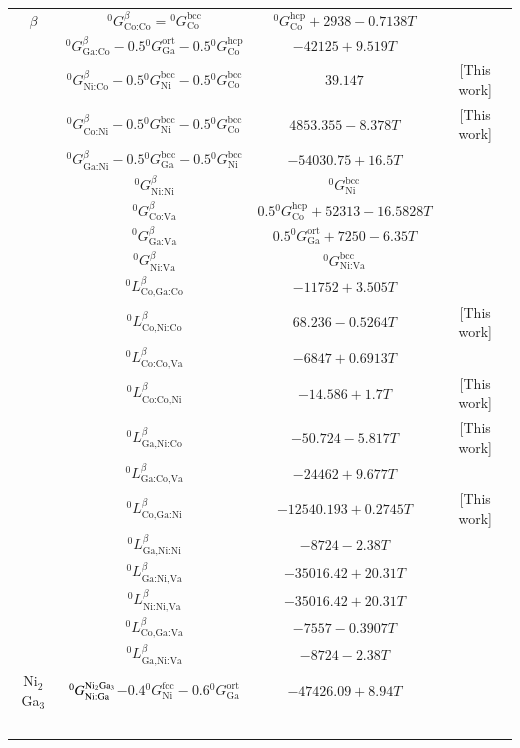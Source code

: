 \documentclass[article]{elsarticle}
\begin{document}
\begin{longtable}{| c | c | c |c|}
\hline
$\beta$ & $^{0}G_{\text{Co:Co}}^{\beta}={}^{\text{0}}G_{\text{Co}}^{\text{bcc}}$ & $^{\text{0}}G_{\text{Co}}^{\text{hcp}}+2938-0.7138T$ & \cite{05Su} \tabularnewline
 & $^{0}G_{\text{Ga:Co}}^{\beta}-0.5{}^{\text{0}}G_{\text{Ga}}^{\text{ort}}-0.5{}^{\text{0}}G_{\text{Co}}^{\text{hcp}}$ & $-42125+9.519T$ & \cite{Cha10} \tabularnewline
  & $^{0}G_{\text{Ni:Co}}^{\beta}-0.5{}^{\text{0}}G_{\text{Ni}}^{\text{bcc}}-0.5{}^{\text{0}}G_{\text{Co}}^{\text{bcc}}$ & $39.147$ & [This work] \tabularnewline
  & $^{0}G_{\text{Co:Ni}}^{\beta}-0.5{}^{\text{0}}G_{\text{Ni}}^{\text{bcc}}-0.5{}^{\text{0}}G_{\text{Co}}^{\text{bcc}}$ & $4853.355-8.378T$ & [This work] \tabularnewline
  & $^{0}G_{\text{Ga:Ni}}^{\beta}-0.5{}^{\text{0}}G_{\text{Ga}}^{\text{bcc}}-0.5{}^{\text{0}}G_{\text{Ni}}^{\text{bcc}}$ & $-54030.75+16.5T$ &  \cite{Ipser04} \tabularnewline
  & $^{0}G_{\text{Ni:Ni}}^{\beta}$ & $^{\text{0}}G_{\text{Ni}}^{\text{bcc}}$  & \cite{Ipser04}  \tabularnewline
  & $^{0}G_{\text{Co:Va}}^{\beta}$ & $0.5{}^{\text{0}}G_{\text{Co}}^{\text{hcp}}+52313-16.5828T$ & \cite{Cha10} \tabularnewline
 & $^{0}G_{\text{Ga:Va}}^{\beta}$ & $0.5{}^{\text{0}}G_{\text{Ga}}^{\text{ort}}+7250-6.35T$ & \cite{Cha10} \tabularnewline
 & $^{0}G_{\text{Ni:Va}}^{\beta}$ & $^{\text{0}}G_{\text{Ni:Va}}^{\text{bcc}}$ & \cite{Ipser04}  \tabularnewline
 & $^{0}L_{\text{Co,Ga:Co}}^{\beta}$ & $-11752+3.505T$ & \cite{Cha10} \tabularnewline
 & $^{0}L_{\text{Co,Ni:Co}}^{\beta}$ & $68.236-0.5264T$ & [This work] \tabularnewline
 & $^{0}L_{\text{Co:Co,Va}}^{\beta}$ & $-6847+0.6913T$ & \cite{Cha10} \tabularnewline
 & $^{0}L_{\text{Co:Co,Ni}}^{\beta}$ & $-14.586+1.7T$ &  [This work] \tabularnewline
 & $^{0}L_{\text{Ga,Ni:Co}}^{\beta}$ & $-50.724-5.817T$ & [This work] \tabularnewline
 & $^{0}L_{\text{Ga:Co,Va}}^{\beta}$ & $-24462+9.677T$ & \cite{Cha10} \tabularnewline
 & $^{0}L_{\text{Co,Ga:Ni}}^{\beta}$ & $-12540.193+0.2745T$ & [This work] \tabularnewline
 & $^{0}L_{\text{Ga,Ni:Ni}}^{\beta}$ & $-8724-2.38T$ & \cite{Ipser04} \tabularnewline
 & $^{0}L_{\text{Ga:Ni,Va}}^{\beta}$ & $-35016.42+20.31T$ & \cite{Ipser04} \tabularnewline
 & $^{0}L_{\text{Ni:Ni,Va}}^{\beta}$ & $-35016.42+20.31T$ & \cite{Ipser04}  \tabularnewline
 & $^{\text{0}}L_{\text{Co,Ga:Va}}^{\beta}$ & $-7557-0.3907T$ & \cite{Cha10} \tabularnewline
 & $^{0}L_{\text{Ga,Ni:Va}}^{\beta}$ & $-8724-2.38T$ & \cite{Ipser04} \tabularnewline
\hline
 Ni$_{2}$Ga$_{3}$& $^{0}G_{\text{Ni:Ga}}^{\text{Ni\ensuremath{_{\text{2}}}Ga\ensuremath{_{\text{3}}}}}$$-0.4{}^{\text{0}}G_{\text{Ni}}^{\text{fcc}}-0.6{}^{\text{0}}G_{\text{Ga}}^{\text{ort}}$ & $-47426.09+8.94T$ & \cite{Ipser04}  \tabularnewline
$$
\end{longtable}
\end{document}
